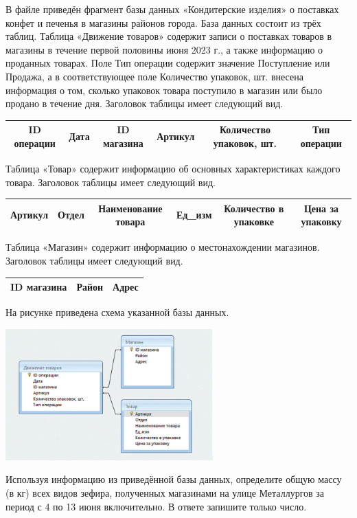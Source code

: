 \documentclass[14pt,a4paper]{article}
\begin{document}
В файле приведён фрагмент базы данных «Кондитерские изделия»
о поставках конфет и печенья в магазины районов города. База данных
состоит из трёх таблиц.
Таблица «Движение товаров» содержит записи о поставках товаров
в магазины в течение первой половины июня 2023 г., а также информацию
о проданных товарах. Поле Тип операции содержит значение Поступление
или Продажа, а в соответствующее поле Количество упаковок, шт. внесена
информация о том, сколько упаковок товара поступило в магазин или было
продано в течение дня. Заголовок таблицы имеет следующий вид.

\begin{center}
    \begin{tabular}{|c|c|c|c|c|c|}
        \hline
        ID операции & Дата & ID магазина & Артикул & Количество упаковок, шт. & Тип операции \\
        \hline
    \end{tabular}
\end{center}

Таблица «Товар» содержит информацию об основных характеристиках
каждого товара. Заголовок таблицы имеет следующий вид.

\begin{center}
    \begin{tabular}{|c|c|c|c|c|c|}
        \hline
        Артикул & Отдел & Наименование товара & Ед\_изм & Количество в упаковке & Цена за упаковку \\
        \hline
    \end{tabular}
\end{center}

Таблица «Магазин» содержит информацию о местонахождении магазинов.
Заголовок таблицы имеет следующий вид.

\begin{center}
    \begin{tabular}{|c|c|c|}
        \hline
        ID магазина & Район & Адрес \\
        \hline
    \end{tabular}
\end{center}

На рисунке приведена схема указанной базы данных.

\begin{center}
    \includegraphics[width=0.6\textwidth]{table.png}
\end{center}

Используя информацию из приведённой базы данных, определите общую
массу (в кг) всех видов зефира, полученных магазинами на улице
Металлургов за период с 4 по 13 июня включительно.
В ответе запишите только число.
\end{document}

